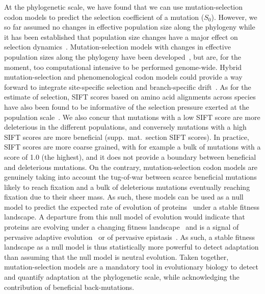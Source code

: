 \documentclass{article}
\newcommand{\Sphy}{S_{0}}
\begin{document}
    At the phylogenetic scale, we have found that we can use mutation-selection codon models to predict the selection coefficient of a mutation ($\Sphy$).
    However, we so far assumed no changes in effective population size along the phylogeny while it has been established that population size changes have a major effect on selection dynamics~\cite{lanfear_population_2014, jones_shifting_2017, platt_protein_2018}.
    Mutation-selection models with changes in effective population sizes along the phylogeny have been developed~\cite{latrille_inferring_2021a}, but are, for the moment, too computational intensive to be performed genome-wide.
    Hybrid mutation-selection and phenomenological codon models could provide a way forward to integrate site-specific selection and branch-specific drift~\cite{brevet_reconstructing_2021a}.
    As for the estimate of selection, SIFT scores based on amino acid alignments across species have also been found to be informative of the selection pressure exerted at the population scale~\cite{chen_hunting_2021}.
    We also concur that mutations with a low SIFT score are more deleterious in the different populations, and conversely mutations with a high SIFT scores are more beneficial (supp.\ mat.\  section SIFT scores).
    In practice, SIFT scores are more coarse grained, with for example a bulk of mutations with a score of 1.0 (the highest), and it does not provide a boundary between beneficial and deleterious mutations.
    On the contrary, mutation-selection codon models are genuinely taking into account the tug-of-war between scarce beneficial mutations likely to reach fixation and a bulk of deleterious mutations eventually reaching fixation due to their sheer mass.
    As such, these models can be used as a null model to predict the expected rate of evolution of proteins~\cite{spielman_relationship_2015, dosreis_how_2015} under a stable fitness landscape.
    A departure from this null model of evolution would indicate that proteins are evolving under a changing fitness landscape~\cite{cvijovic_fate_2015, rodrigue_detecting_2017, tamuri_mutationselection_2021} and is a signal of pervasive adaptive evolution~\cite{rodrigue_bayesian_2021} or of pervasive epistasis~\cite{rodrigue_detecting_2017}.
    As such, a stable fitness landscape as a null model is thus statistically more powerful to detect adaptation than assuming that the null model is neutral evolution.
    Taken together, mutation-selection models are a mandatory tool in evolutionary biology to detect and quantify adaptation at the phylogenetic scale, while acknowledging the contribution of beneficial back-mutations.
\end{document}

